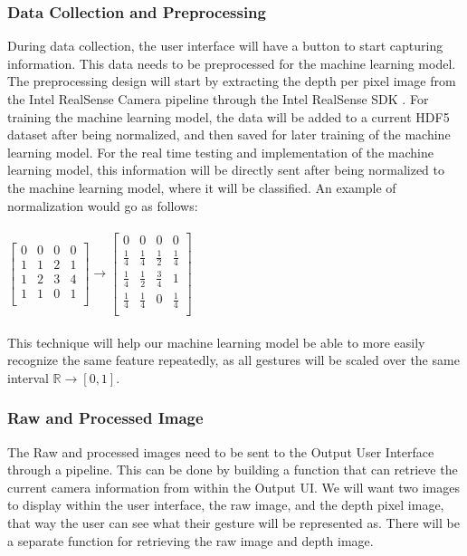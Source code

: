 \documentclass[onecolumn, draftclsnofoot,10pt, compsoc]{IEEEtran}
\begin{document}
\subsubsection{Data Collection and Preprocessing}
During data collection, the user interface will have a button to start capturing information.
This data needs to be preprocessed for the machine learning model.
The preprocessing design will start by extracting the depth per pixel image from the Intel RealSense Camera pipeline through the Intel RealSense SDK \cite{first}.
For training the machine learning model, the data will be added to a current HDF5 dataset after being normalized, and then saved for later training of the machine learning model.
For the real time testing and implementation of the machine learning model, this information will be directly sent after being normalized to the machine learning model, where it will be classified.
An example of normalization would go as follows: \\
\\$
\begin{bmatrix}
    0 & 0 & 0 & 0 \\
    1 & 1 & 2 & 1 \\
    1 & 2 & 3 & 4 \\
    1 & 1 & 0 & 1 \\
\end{bmatrix}
\xrightarrow{}
\begin{bmatrix}
    0 & 0 & 0 & 0 \\
    \frac{1}{4} & \frac{1}{4} & \frac{1}{2} & \frac{1}{4} \\
    \frac{1}{4} & \frac{1}{2} & \frac{3}{4} & 1 \\
    \frac{1}{4} & \frac{1}{4} & 0 & \frac{1}{4} \\
\end{bmatrix}
$ \\
\\
This technique will help our machine learning model be able to more easily recognize the same feature repeatedly, as all gestures will be scaled over the same interval $\mathbb{R} \rightarrow{} [0, 1]$.
\subsubsection{Raw and Processed Image}
The Raw and processed images need to be sent to the Output User Interface through a pipeline.
This can be done by building a function that can retrieve the current camera information from within the Output UI.
We will want two images to display within the user interface, the raw image, and the depth pixel image, that way the user can see what their gesture will be represented as.
There will be a separate function for retrieving the raw image and depth image.
\end{document}
